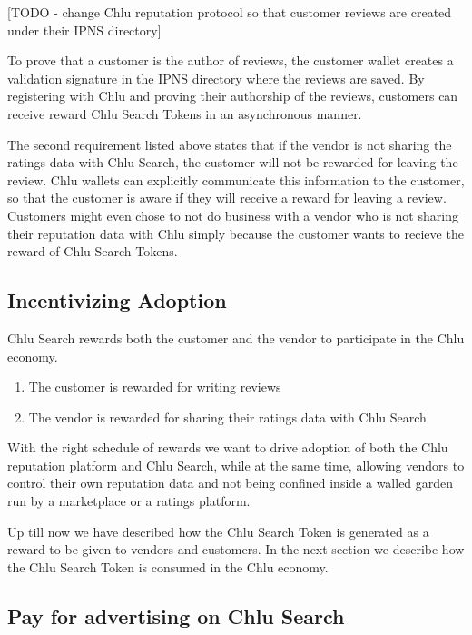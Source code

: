 \documentclass[a4paper]{article}
\begin{document}
[TODO - change Chlu reputation protocol so that customer reviews are
  created under their IPNS directory]

To prove that a customer is the author of reviews, the customer wallet
creates a validation signature in the IPNS directory where the reviews
are saved. By registering with Chlu and proving their authorship of
the reviews, customers can receive reward Chlu Search Tokens in an
asynchronous manner.

The second requirement listed above states that if the vendor is not
sharing the ratings data with Chlu Search, the customer will not be
rewarded for leaving the review. Chlu wallets can explicitly
communicate this information to the customer, so that the customer is
aware if they will receive a reward for leaving a review. Customers
might even chose to not do business with a vendor who is not sharing
their reputation data with Chlu simply because the customer wants to
recieve the reward of Chlu Search Tokens.

\subsection{Incentivizing Adoption}

Chlu Search rewards both the customer and the vendor to participate in
the Chlu economy.

\begin{enumerate}
\item The customer is rewarded for writing reviews
\item The vendor is rewarded for sharing their ratings data with Chlu
  Search
\end{enumerate}

With the right schedule of rewards we want to drive adoption of both
the Chlu reputation platform and Chlu Search, while at the same time,
allowing vendors to control their own reputation data and not being
confined inside a walled garden run by a marketplace or a ratings
platform.

Up till now we have described how the Chlu Search Token is generated
as a reward to be given to vendors and customers. In the next section
we describe how the Chlu Search Token is consumed in the Chlu economy.

\subsection{Pay for advertising on Chlu Search}
\end{document}
